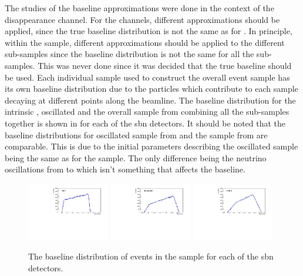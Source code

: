 The studies of the baseline approximations were done in the context of the \numu disappearance channel. For the \nue channels, different approximations should be applied, since the true baseline distribution is not the same as for \numu. In principle, within the \nue sample, different approximations should be applied to the different sub-samples since the baseline distribution is not the same for all the sub-samples. This was never done since it was decided that the true baseline should be used. Each individual sample used to construct the overall \nue event sample has its own baseline distribution due to the particles which contribute to each sample decaying at different points along the beamline. The baseline distribution for the intrinsic \nue, oscillated \nue and the overall \nue sample from combining all the sub-samples together is shown in  for each of the \gls{sbn} detectors. It should be noted that the baseline distributions for oscillated \nue sample from  and the \numu sample from  are comparable. This is due to the initial parameters describing the oscillated sample being the same as for the \numu sample. The only difference being the neutrino oscillations from \numu to \nue which isn't something that affects the baseline.

\begin{figure}[!h]
    \centering
    \includegraphics[width = 0.32\textwidth]{figures-chap5/SBND_numu.pdf}
    \includegraphics[width = 0.32\textwidth]{figures-chap5/MicroBooNE_numu.pdf}
    \includegraphics[width = 0.32\textwidth]{figures-chap5/ICARUS_numu.pdf}
    \caption{The baseline distribution of events in the \numu sample for each of the \gls{sbn} detectors.}
    \label{fig:numu_baseline}
\end{figure}

